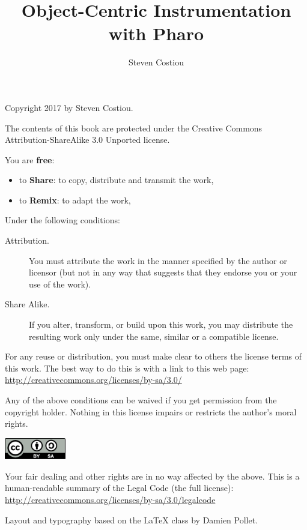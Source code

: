 \documentclass[10pt,twoside,english]{_support/latex/sbabook/sbabook}
\title{Object-Centric Instrumentation with Pharo}
\author{Steven Costiou}
\begin{document}
\maketitle
\pagestyle{titlingpage}
\thispagestyle{titlingpage} %

\cleartoverso
{\small

  Copyright 2017 by Steven Costiou.

  The contents of this book are protected under the Creative Commons
  Attribution-ShareAlike 3.0 Unported license.

  You are \textbf{free}:
  \begin{itemize}
  \item to \textbf{Share}: to copy, distribute and transmit the work,
  \item to \textbf{Remix}: to adapt the work,
  \end{itemize}

  Under the following conditions:
  \begin{description}
  \item[Attribution.] You must attribute the work in the manner specified by the
    author or licensor (but not in any way that suggests that they endorse you
    or your use of the work).
  \item[Share Alike.] If you alter, transform, or build upon this work, you may
    distribute the resulting work only under the same, similar or a compatible
    license.
  \end{description}

  For any reuse or distribution, you must make clear to others the
  license terms of this work. The best way to do this is with a link to
  this web page: \\
  \url{http://creativecommons.org/licenses/by-sa/3.0/}

  Any of the above conditions can be waived if you get permission from
  the copyright holder. Nothing in this license impairs or restricts the
  author's moral rights.

  \begin{center}
    \includegraphics[width=0.2\textwidth]{_support/latex/sbabook/CreativeCommons-BY-SA.pdf}
  \end{center}

  Your fair dealing and other rights are in no way affected by the
  above. This is a human-readable summary of the Legal Code (the full
  license): \\
  \url{http://creativecommons.org/licenses/by-sa/3.0/legalcode}

  \vfill

  Layout and typography based on the  \LaTeX{} class by Damien
  Pollet.
}
\end{document}
